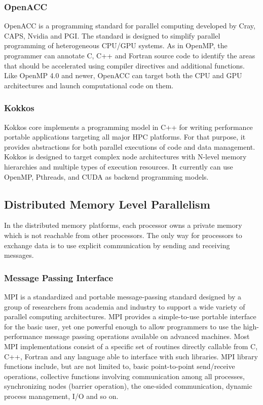\subsubsection{OpenACC}

OpenACC \cite{wienke2012openacc} is a programming standard for parallel computing developed by Cray, CAPS, Nvidia and PGI. The standard is designed to simplify parallel programming of heterogeneous CPU/GPU systems. As in OpenMP, the programmer can annotate C, C++ and Fortran source code to identify the areas that should be accelerated using compiler directives and additional functions. Like OpenMP 4.0 and newer, OpenACC can target both the CPU and GPU architectures and launch computational code on them.

\subsubsection{Kokkos}

Kokkos \cite{edwards2014kokkos} core implements a programming model in C++ for writing performance portable applications targeting all major HPC platforms. For that purpose, it provides abstractions for both parallel executions of code and data management. Kokkos is designed to target complex node architectures with N-level memory hierarchies and multiple types of execution resources. It currently can use OpenMP, Pthreads, and CUDA as backend programming models.


\subsection{Distributed Memory Level Parallelism}

In the distributed memory platforms, each processor owns a private memory which is not reachable from other processors. The only way for processors to exchange data is to use explicit communication by sending and receiving messages. 

\subsubsection{Message Passing Interface}

MPI \cite{gropp1999using} is a standardized and portable message-passing standard designed by a group of researchers from academia and industry to support a wide variety of parallel computing architectures. MPI provides a simple-to-use portable interface for the basic user, yet one powerful enough to allow programmers to use the high-performance message passing operations available on advanced machines. Most MPI implementations consist of a specific set of routines directly callable from C, C++, Fortran and any language able to interface with such libraries.  MPI library functions include, but are not limited to, basic point-to-point send/receive operations, collective functions involving communication among all processes, synchronizing nodes (barrier operation), the one-sided communication, dynamic process management, I/O and so on. 

